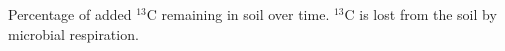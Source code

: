 Percentage of added $^{13}$C remaining in soil over time. $^{13}$C is
lost from the soil by microbial respiration.
